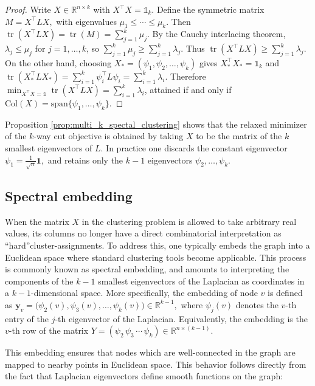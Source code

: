 \documentclass[reprint,onecolumn]{article}
\newcommand{\R}{\mathbb{R}}
\newcommand{\1}{\mathbb{1}}
\newcommand{\y}{\mathbf{y}}
\newcommand{\0}{\mathbf{0}}
\DeclareMathOperator\tr{tr}
\begin{document}
\begin{proof}
Write \(X\in\R^{n\times k}\) with \(X^\top X=\1_k\).  Define the symmetric matrix
\(
M = X^\top L X,
\)
with eigenvalues \(\mu_1\le\cdots\le\mu_k\).  Then
\(
\tr(X^\top L X)
=
\tr(M)
=
\sum_{j=1}^k \mu_j.
\)
By the Cauchy interlacing theorem,
\(\lambda_j \le \mu_j\) for \(j=1,\dots,k\), so
\(\sum_{j=1}^k \mu_j \ge \sum_{j=1}^k \lambda_j\).  Thus
\(
\tr(X^\top L X)
\ge
\sum_{j=1}^k \lambda_j
\).
On the other hand, choosing
\(X_* = (\psi_1,\psi_2,\dots,\psi_k)\) gives
\(X_*^\top X_* = \1_k\) and
\(
\tr(X_*^\top L X_*)
=\sum_{i=1}^k \psi_i^\top L \psi_i
=\sum_{i=1}^k \lambda_i.
\)
Therefore
\(\min_{X^\top X = \1}\tr(X^\top L X)=\sum_{i=1}^k\lambda_i\), attained if and only if
\(\textrm{Col}(X)=\textrm{span}\{\psi_1,\dots,\psi_k\}\).
\end{proof}
Proposition \ref{prop:multi_k_spectal_clustering} shows that the relaxed minimizer of the $k$-way cut objective is obtained by taking $X$ to be the matrix of the $k$ smallest eigenvectors of $L$.  In practice one discards the constant eigenvector \(\psi_1 = \frac{1}{\sqrt n}\mathbf1,\) and retains only the $k-1$ eigenvectors \(\psi_2,\dots,\psi_k\). 


\subsection{Spectral embedding}

When the matrix $X$ in the clustering problem is allowed to take arbitrary real values, its columns no longer have a direct combinatorial interpretation as ``hard''cluster-assignments.  To address this, one typically embeds the graph into a Euclidean space where standard clustering tools become applicable. This process is commonly known as spectral embedding, and amounts to interpreting the components of the $k-1$ smallest eigenvectors of the Laplacian as coordinates in a $k-1$-dimensional space. More specifically, the embedding of node $v$ is defined as
\(
\y_v = \bigl(\psi_2(v), \psi_3(v), \dots, \psi_k(v)\bigr) \in \R^{k-1},
\)
where $\psi_j(v)$ denotes the $v$-th entry of the $j$-th eigenvector of the Laplacian. Equivalently, the embedding is the $v$-th row of the matrix
\(
Y = (\psi_2\, \psi_3\, \cdots\, \psi_k) \in \R^{n \times (k-1)}.
\)

This embedding ensures that nodes which are well-connected in the graph are mapped to nearby points in Euclidean space. This behavior follows directly from the fact that Laplacian eigenvectors define smooth functions on the graph:
\end{document}
